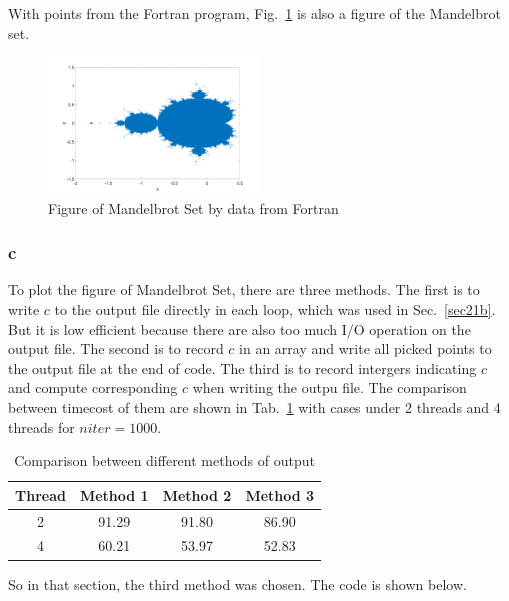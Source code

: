 \documentclass[letterpaper,10pt]{article}
\begin{document}
With points from the Fortran program, Fig.~\ref{figMS} is also a figure of the Mandelbrot set. 
\begin{figure}[h]
  \centering
  \includegraphics[width=0.5\textwidth]{F1_4.png}
  \caption{Figure of Mandelbrot Set by data from Fortran}
  \label{figMS}
\end{figure}

\subsubsection{c}\label{sec21c}
To plot the figure of Mandelbrot Set, there are three methods. The first is to write $c$ to the output file 
directly in each loop, which was used in Sec.~\ref{sec21b}. But it is low efficient because there are also 
too much I/O operation on the output file. 
The second is to record $c$ in an array and write all picked points to the output file 
at the end of code. The third is to record intergers indicating $c$ and compute corresponding $c$ 
when writing the outpu file. The comparison between timecost of them are shown in Tab.~\ref{tabComWr} with cases 
under 2 threads and 4 threads for $niter=1000$. 
\begin{table}
\centering
\caption{Comparison between different methods of output}\label{tabComWr}
\begin{tabular}{cccc}
  \hline
  Thread & Method 1 & Method 2 & Method 3 \\
  \hline
  2 & 91.29 & 91.80 & 86.90 \\
  4 & 60.21 & 53.97 & 52.83 \\
  \hline
\end{tabular}
\end{table}

So in that section, the third method was chosen. The code is shown below. 
\end{document}
